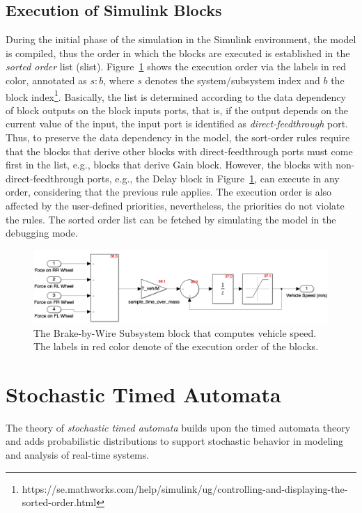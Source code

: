 \subsection*{Execution of Simulink Blocks}
During the initial phase of the simulation in the Simulink environment, the model is compiled, thus the order in which the blocks are executed is established in the \textit{sorted order} list (slist). Figure~\ref{fig_sm_exec_order} shows the execution order via the labels in red color, annotated as $s:b$, where $s$ denotes the system/subsystem index and $b$ the block index\footnote{https://se.mathworks.com/help/simulink/ug/controlling-and-displaying-the-sorted-order.html}. Basically, the list is determined according to the data dependency of block outputs on the block inputs ports, that is, if the output depends on the current value of the input, the input port is identified as \textit{direct-feedthrough} port. Thus, to preserve the data dependency in the model, the sort-order rules require that the blocks that derive other blocks with direct-feedthrough ports must come first in the list, e.g., blocks that derive Gain block. However, the blocks with non-direct-feedthrough ports, e.g., the Delay block in Figure~\ref{fig_sm_exec_order}, can execute in any order, considering that the previous rule applies. The execution order is also affected by the user-defined priorities, nevertheless, the priorities do not violate the rules. The sorted order list can be fetched by simulating the model in the debugging mode.
\begin{figure}
	\centering
	\includegraphics[width=1\linewidth]{images/sm_exec_order}
	\caption{The Brake-by-Wire Subsystem block that computes vehicle speed. The labels in red color denote of the execution order of the blocks.}
	\label{fig_sm_exec_order}
\end{figure}

\section{Stochastic Timed Automata}
The theory of \textit{stochastic timed automata}\cite{David2011StatisticalAutomata} builds upon the timed automata theory and adds probabilistic distributions to support stochastic behavior in modeling and analysis of real-time systems. 

